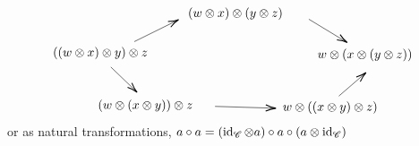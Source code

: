 \begin{definition}
\begin{enumerate}
\[\begin{tikzpicture}[x=0.75pt,y=0.75pt,yscale=-1,xscale=1]
\draw    (162,295.1) -- (207.41,272.69) ;
\draw [shift={(209.2,271.8)}, rotate = 153.73] [color={rgb, 255:red, 0; green, 0; blue, 0 }  ][line width=0.75]    (10.93,-3.29) .. controls (6.95,-1.4) and (3.31,-0.3) .. (0,0) .. controls (3.31,0.3) and (6.95,1.4) .. (10.93,3.29)   ;
\draw    (348,271.2) -- (387.29,295.06) ;
\draw [shift={(389,296.1)}, rotate = 211.27] [color={rgb, 255:red, 0; green, 0; blue, 0 }  ][line width=0.75]    (10.93,-3.29) .. controls (6.95,-1.4) and (3.31,-0.3) .. (0,0) .. controls (3.31,0.3) and (6.95,1.4) .. (10.93,3.29)   ;
\draw    (137,322.2) -- (163.56,347.71) ;
\draw [shift={(165,349.1)}, rotate = 223.85] [color={rgb, 255:red, 0; green, 0; blue, 0 }  ][line width=0.75]    (10.93,-3.29) .. controls (6.95,-1.4) and (3.31,-0.3) .. (0,0) .. controls (3.31,0.3) and (6.95,1.4) .. (10.93,3.29)   ;
\draw    (248,364.1) -- (311,366.04) ;
\draw [shift={(313,366.1)}, rotate = 181.76] [color={rgb, 255:red, 0; green, 0; blue, 0 }  ][line width=0.75]    (10.93,-3.29) .. controls (6.95,-1.4) and (3.31,-0.3) .. (0,0) .. controls (3.31,0.3) and (6.95,1.4) .. (10.93,3.29)   ;
\draw    (380,353.1) -- (407.49,329.41) ;
\draw [shift={(409,328.1)}, rotate = 139.24] [color={rgb, 255:red, 0; green, 0; blue, 0 }  ][line width=0.75]    (10.93,-3.29) .. controls (6.95,-1.4) and (3.31,-0.3) .. (0,0) .. controls (3.31,0.3) and (6.95,1.4) .. (10.93,3.29)   ;

\draw (74,299.4) node [anchor=north west][inner sep=0.75pt]    {$(( w\otimes x) \otimes y) \otimes z$};
\draw (218,257.4) node [anchor=north west][inner sep=0.75pt]    {$( w\otimes x) \otimes ( y\otimes z)$};
\draw (356,301.4) node [anchor=north west][inner sep=0.75pt]    {$w\otimes ( x\otimes ( y\otimes z))$};
\draw (122,355.4) node [anchor=north west][inner sep=0.75pt]    {$( w\otimes ( x\otimes y)) \otimes z$};
\draw (319,357.4) node [anchor=north west][inner sep=0.75pt]    {$w\otimes (( x\otimes y) \otimes z)$};


\end{tikzpicture}
\]
	or as natural transformations, $a\circ a=(\operatorname{\mathrm{id}}_{\mathscr{C}}\otimes a)\circ a\circ(a\otimes\operatorname{\mathrm{id}}_{\mathscr{C}})$
	\end{enumerate}
\end{definition}

